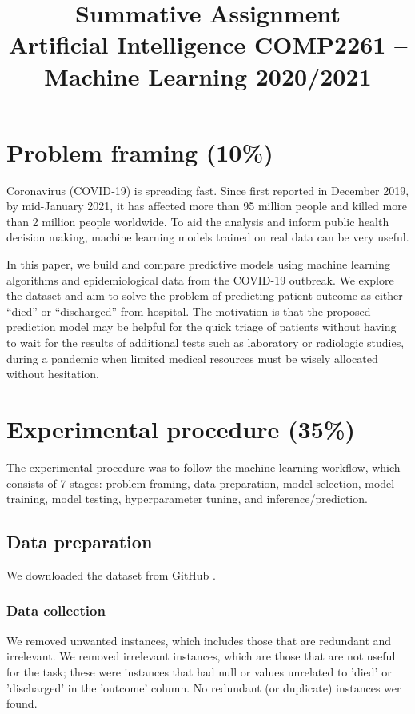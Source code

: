 \documentclass[twoside,11pt]{article}
\begin{document}
\title{Summative Assignment\\ 
Artificial Intelligence COMP2261 –\\
Machine Learning 2020/2021}

\maketitle

\section{Problem framing (10\%)}
Coronavirus (COVID‑19) is spreading fast. Since first reported in December 2019, by mid-January 2021, it has affected more than 95 million people and killed more than 2 million people worldwide. To aid the analysis and inform public health decision making, machine learning models trained on real data can be very useful.

In this paper, we build and compare predictive models using machine learning algorithms and epidemiological data from the COVID-19 outbreak. We explore the dataset and aim to solve the problem of predicting patient outcome as either “died” or “discharged” from hospital. The motivation is that the proposed prediction model may be helpful for the quick triage of patients without having to wait for the results of additional tests such as laboratory or radiologic studies, during a pandemic when limited medical resources must be wisely allocated without hesitation. 

\section{Experimental procedure (35\%)}
The experimental procedure was to follow the machine learning workflow, which consists of 7 stages: problem framing, data preparation, model selection, model training, model testing, hyperparameter tuning, and inference/prediction. 

\subsection{Data preparation}
We downloaded the dataset from GitHub \cite{xu2020Epidemiological}.

\subsubsection{Data collection}
We removed unwanted instances, which includes those that are redundant and irrelevant. We removed irrelevant instances, which are those that are not useful for the task; these were instances that had null or values unrelated to 'died' or 'discharged' in the 'outcome' column. No redundant (or duplicate) instances wer found.
\end{document}
